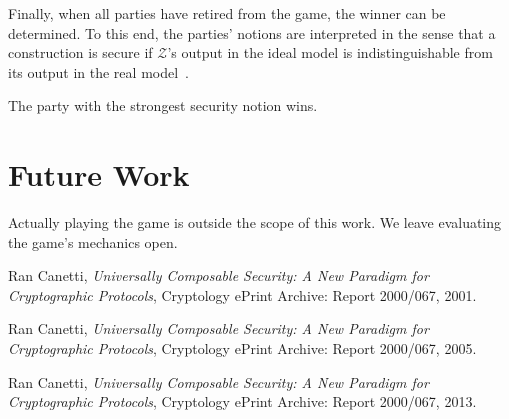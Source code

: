 \documentclass{llncs}
\begin{document}
Finally, when all parties have retired from the game, the winner can be determined. To this end, the parties' notions are interpreted in the sense that a construction is secure if $\mathcal{Z}$'s output in the ideal model is indistinguishable from its output in the real model~\cite{can01,can05,can13}.

\begin{theorem}
	The party with the strongest security notion wins.
\end{theorem}

\section{Future Work}
Actually playing the game is outside the scope of this work.
We leave evaluating the game's mechanics open.

\begin{thebibliography}{9}
  Ran Canetti,
  \emph{Universally Composable Security: A New Paradigm for Cryptographic Protocols},
  Cryptology ePrint Archive: Report 2000/067,
  2001.

  Ran Canetti,
  \emph{Universally Composable Security: A New Paradigm for Cryptographic Protocols},
  Cryptology ePrint Archive: Report 2000/067,
  2005.

  Ran Canetti,
  \emph{Universally Composable Security: A New Paradigm for Cryptographic Protocols},
  Cryptology ePrint Archive: Report 2000/067,
  2013.
\end{thebibliography}
\end{document}
